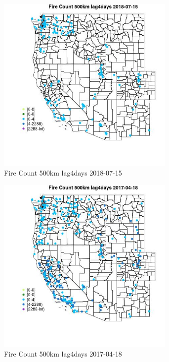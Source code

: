 \begin{figure} 
\centering  
\includegraphics[width=0.77\textwidth]{Code_Outputs/Report_ML_input_PM25_Step4_part_e_de_duplicated_aves_compiled_2019-05-21wNAs_MapObsFire_Count_500km_lag4days2018-07-15.jpg} 
\caption{\label{fig:Report_ML_input_PM25_Step4_part_e_de_duplicated_aves_compiled_2019-05-21wNAsMapObsFire_Count_500km_lag4days2018-07-15}Fire Count 500km lag4days 2018-07-15} 
\end{figure} 
 

\begin{figure} 
\centering  
\includegraphics[width=0.77\textwidth]{Code_Outputs/Report_ML_input_PM25_Step4_part_e_de_duplicated_aves_compiled_2019-05-21wNAs_MapObsFire_Count_500km_lag4days2017-04-18.jpg} 
\caption{\label{fig:Report_ML_input_PM25_Step4_part_e_de_duplicated_aves_compiled_2019-05-21wNAsMapObsFire_Count_500km_lag4days2017-04-18}Fire Count 500km lag4days 2017-04-18} 
\end{figure} 
 

